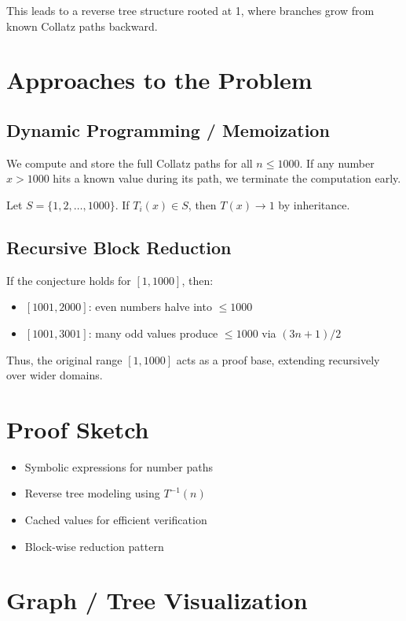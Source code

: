 \documentclass{article}
\begin{document}
This leads to a reverse tree structure rooted at 1, where branches grow from known Collatz paths backward.

\section{Approaches to the Problem}

\subsection{Dynamic Programming / Memoization}

We compute and store the full Collatz paths for all \( n \leq 1000 \). If any number \( x > 1000 \) hits a known value during its path, we terminate the computation early.

Let \( S = \{1, 2, \dots, 1000\} \). If \( T_i(x) \in S \), then \( T(x) \to 1 \) by inheritance.

\subsection{Recursive Block Reduction}

If the conjecture holds for \( [1, 1000] \), then:
\begin{itemize}
    \item \( [1001, 2000] \): even numbers halve into \( \leq 1000 \)
    \item \( [1001, 3001] \): many odd values produce \( \leq 1000 \) via \( (3n + 1)/2 \)
\end{itemize}

Thus, the original range \( [1, 1000] \) acts as a proof base, extending recursively over wider domains.

\section{Proof Sketch}

\begin{itemize}
    \item Symbolic expressions for number paths
    \item Reverse tree modeling using \( T^{-1}(n) \)
    \item Cached values for efficient verification
    \item Block-wise reduction pattern
\end{itemize}

\section{Graph / Tree Visualization}
\end{document}
